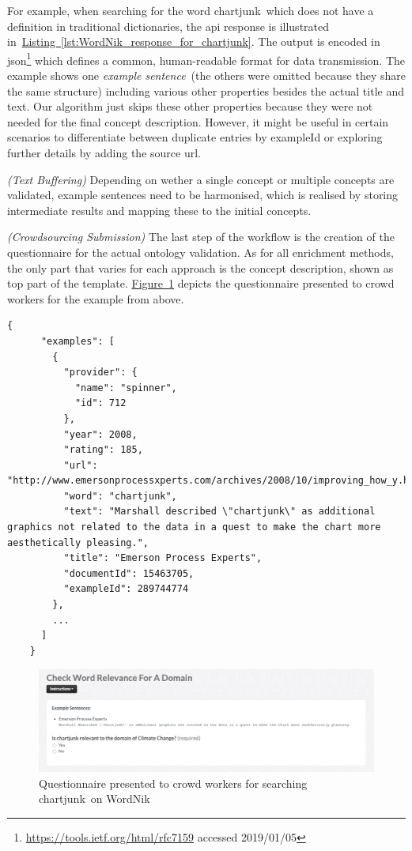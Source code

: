 \begin{enumerate}[label=\textbf{[Step \Roman*]},leftmargin=\widthof{[Step III]}+\labelsep]
		  For example, when searching for the word \guillemotright chartjunk\guillemotleft~which does not
		  have a definition in traditional dictionaries, the \gls{api} response is illustrated
		  in~\hyperref[lst:WordNik_response_for_chartjunk]{Listing~\ref*{lst:WordNik_response_for_chartjunk}}. The
		  output is encoded in \gls{json}\footnote{\url{https://tools.ietf.org/html/rfc7159} accessed 2019/01/05}
		  which defines a common, human-readable format for data transmission. The example shows one \emph{example
		  sentence}~(the others were omitted because they share the same structure) including various other
		  properties besides the actual title and text. Our algorithm just skips these other properties because they were
		  not needed for the final concept description. However, it might be useful in certain scenarios to differentiate 
		  between duplicate entries by exampleId or exploring further details by adding the source \gls{url}.
	\item \emph{(Text Buffering)} Depending on wether a single concept or multiple concepts are validated, example sentences
	      need to be harmonised, which is realised by storing intermediate results and mapping these to the initial concepts.
	\item \emph{(Crowdsourcing Submission)} The last step of the workflow is the creation of the questionnaire for the actual
	      ontology validation. As for all enrichment methods, the only part that varies for each approach is the concept
		  description, shown as top part of the template.
		  \hyperref[fig:wordnik_example_questionaire]{Figure~\ref*{fig:wordnik_example_questionaire}} depicts the
		  questionnaire presented to crowd workers for the example from above.
\end{enumerate}

\begin{lstlisting}[frame=single,breaklines=true,postbreak=\mbox{\textcolor{black}{$\hookrightarrow$}\space},caption=WordNik \gls{api} response for the word \guillemotright chartjunk\guillemotleft,label=lst:WordNik_response_for_chartjunk]
	{
	  "examples": [
	    {
	      "provider": {
	        "name": "spinner",
	        "id": 712
	      },
	      "year": 2008,
	      "rating": 185,
	      "url": "http://www.emersonprocessxperts.com/archives/2008/10/improving_how_y.html",
	      "word": "chartjunk",
	      "text": "Marshall described \"chartjunk\" as additional graphics not related to the data in a quest to make the chart more aesthetically pleasing.",
	      "title": "Emerson Process Experts",
	      "documentId": 15463705,
	      "exampleId": 289744774
	    },
		...
	  ]
	}
\end{lstlisting}

\begin{figure}
	 \centering
	 \includegraphics[width=\textwidth]{screenshots/questionaire_wordnik_example}
	 \caption{Questionnaire presented to crowd workers for searching \guillemotright chartjunk\guillemotleft~on WordNik}\label{fig:wordnik_example_questionaire}
\end{figure}

